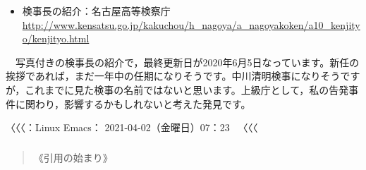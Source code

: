 \documentclass[
]{ltjarticle}
\providecommand{\tightlist}{%
  \setlength{\itemsep}{0pt}\setlength{\parskip}{0pt}}
\begin{document}
\begin{itemize}
\tightlist
\item
  検事長の紹介：名古屋高等検察庁
  \url{http://www.kensatsu.go.jp/kakuchou/h\_nagoya/a\_nagoyakoken/a10\_kenjityo/kenjityo.html} 
\end{itemize}

　写真付きの検事長の紹介で，最終更新日が2020年6月5日なっています。新任の挨拶であれば，まだ一年中の任期になりそうです。中川清明検事になりそうですが，これまでに見た検事の名前ではないと思います。上級庁として，私の告発事件に関わり，影響するかもしれないと考えた発見です。

〈〈〈：Linux Emacs： 2021-04-02（金曜日）07：23 　〈〈〈

\hypertarget{section}{%
\subsubsection{}\label{section}}

\begin{quote}
《引用の始まり》
\end{quote}
\end{document}
